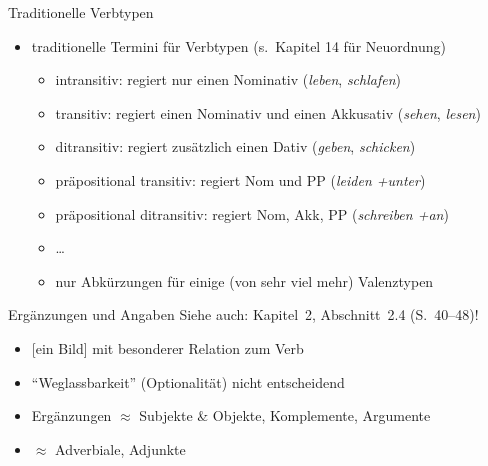 \begin{frame}
  {Traditionelle Verbtypen}
  \pause
  \begin{itemize}[<+->]
    \item traditionelle Termini für Verbtypen (s.\ Kapitel 14 für Neuordnung)
      \begin{itemize}[<+->]
        \item \alert{intransitiv}: regiert nur einen Nominativ (\textit{leben}, \textit{schlafen})
        \item \alert{transitiv}: regiert einen Nominativ und einen Akkusativ (\textit{sehen}, \textit{lesen})
        \item \alert{ditransitiv}: regiert zusätzlich einen Dativ (\textit{geben}, \textit{schicken})
        \item \alert{präpositional transitiv}: regiert Nom und PP (\textit{leiden +unter})
        \item \alert{präpositional ditransitiv}: regiert Nom, Akk, PP (\textit{schreiben +an})
        \item \ldots
          \Zeile
        \item nur Abkürzungen für einige (von sehr viel mehr) \alert{Valenztypen}
      \end{itemize}
  \end{itemize}
\end{frame}

\begin{frame}
  {Ergänzungen und Angaben}
  \pause
  Siehe auch: Kapitel~2, Abschnitt~2.4 (S.~40--48)!\\
  \pause\Halbzeile
  \begin{exe}
    \ex\label{ex:valenz034}
    \begin{xlist}
      \pause
      \pause
      \pause
    \end{xlist}
  \end{exe}
  \pause\Halbzeile
  \begin{itemize}[<+->]
    \item \alert{[ein Bild]} mit besonderer Relation zum Verb
    \item "`Weglassbarkeit"' (Optionalität) nicht entscheidend
      \Halbzeile
    \item \alert{Ergänzungen} $\approx$ Subjekte \& Objekte, Komplemente, Argumente
    \item {} $\approx$ Adverbiale, Adjunkte
  \end{itemize}
\end{frame}

